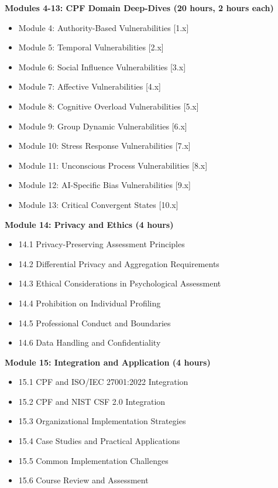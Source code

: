 \documentclass[11pt,a4paper]{article}
\begin{document}
\textbf{Modules 4-13: CPF Domain Deep-Dives (20 hours, 2 hours each)}
\begin{itemize}
\item Module 4: Authority-Based Vulnerabilities [1.x]
\item Module 5: Temporal Vulnerabilities [2.x]
\item Module 6: Social Influence Vulnerabilities [3.x]
\item Module 7: Affective Vulnerabilities [4.x]
\item Module 8: Cognitive Overload Vulnerabilities [5.x]
\item Module 9: Group Dynamic Vulnerabilities [6.x]
\item Module 10: Stress Response Vulnerabilities [7.x]
\item Module 11: Unconscious Process Vulnerabilities [8.x]
\item Module 12: AI-Specific Bias Vulnerabilities [9.x]
\item Module 13: Critical Convergent States [10.x]
\end{itemize}

\textbf{Module 14: Privacy and Ethics (4 hours)}
\begin{itemize}
\item 14.1 Privacy-Preserving Assessment Principles
\item 14.2 Differential Privacy and Aggregation Requirements
\item 14.3 Ethical Considerations in Psychological Assessment
\item 14.4 Prohibition on Individual Profiling
\item 14.5 Professional Conduct and Boundaries
\item 14.6 Data Handling and Confidentiality
\end{itemize}

\textbf{Module 15: Integration and Application (4 hours)}
\begin{itemize}
\item 15.1 CPF and ISO/IEC 27001:2022 Integration
\item 15.2 CPF and NIST CSF 2.0 Integration
\item 15.3 Organizational Implementation Strategies
\item 15.4 Case Studies and Practical Applications
\item 15.5 Common Implementation Challenges
\item 15.6 Course Review and Assessment
\end{itemize}
\end{document}
